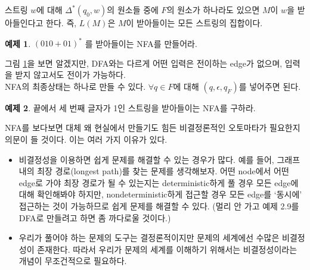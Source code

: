 \documentclass[b5paper]{book}
\theoremstyle{definition}
\newtheorem{ex}{예제}[chapter]
\begin{document}
스트링 $w$에 대해 $\Delta^* (q_0, w)$의 원소들 중에 $F$의 원소가 하나라도 있으면
$M$이 $w$을 받아들인다고 한다. 즉, $L(M)$은 $M$이 받아들이는 모든 스트링의 집합이다. 
\begin{ex} \label{010+01}
    $(010+01)^*$ 를 받아들이는 NFA를 만들어라.
\end{ex} 
\begin{figure}[ht]
    \centering
    \caption{} 
    \label{(010+01)^*}
\end{figure}
그림 \ref{(010+01)^*}을 보면 알겠지만, DFA와는 다르게 어떤 입력은 전이하는 edge가
없으며, 입력을 받지 않고서도 전이가 가능하다.\\
NFA의 최종상태는 하나로 만들 수 있다. $\forall q \in F$에 대해 $(q, \epsilon, q_F )$를
넣어주면 된다.
\begin{ex}
    끝에서 세 번째 글자가 1인 스트링을 받아들이는 NFA를 구하라. 
\end{ex}
NFA를 보다보면 대체 왜 현실에서 만들기도 힘든
비결정론적인 오토마타가 필요한지 의문이 들 것이다. 이는 여러 가지 이유가 있다.
\begin{itemize}
    \item 비결정성을 이용하면 쉽게 문제를 해결할 수 있는 경우가 많다.
    예를 들어, 그래프 내의 최장 경로(longest path)를 찾는 문제를 생각해보자.
    어떤 node에서 어떤 edge로 가야 최장 경로가 될 수 있는지는 deterministic하게
    풀 경우 모든 edge에 대해 확인해봐야 하지만, nondeterministic하게 접근할 경우
    모든 edge를 `동시에' 접근하는 것이 가능하므로 쉽게 문제를 해결할 수 있다. (멀리
    안 가고 예제 2.9를 DFA로 만들려고 하면 좀 까다로울 것이다.)
    \item 우리가 풀어야 하는 문제의 도구는 결정론적이지만 문제의 세계에선 수많은
    비결정성이 존재한다. 따라서 우리가 문제의 세계를 이해하기 위해서는 비결정성이라는
    개념이 무조건적으로 필요하다.
\end{itemize}
\end{document}
